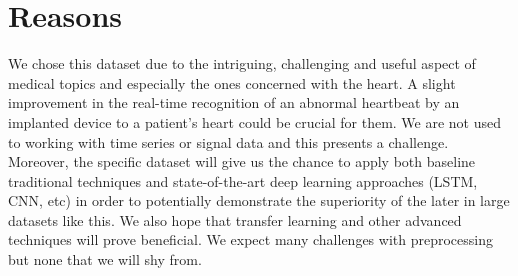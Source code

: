 \documentclass[11pt]{article}
\begin{document}
\section{Reasons}
We chose this dataset due to the intriguing, challenging and useful aspect of medical topics and especially the ones concerned with the heart. A slight improvement in the real-time recognition of an abnormal heartbeat by an implanted device to a patient's heart could be crucial for them. We are not used to working with time series or signal data and this presents a challenge. Moreover, the specific dataset will give us the chance to apply both baseline traditional techniques and state-of-the-art deep learning approaches (LSTM, CNN, etc) in order to potentially demonstrate the superiority of the later in large datasets like this. We also hope that transfer learning and other advanced techniques will prove beneficial. We expect many challenges with preprocessing but none that we will shy from.

\nocite{*}



\end{document}

